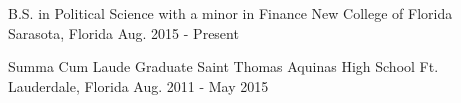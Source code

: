

\begin{cventries}

  \cventry
    {B.S. in Political Science with a minor in Finance} %
    {New College of Florida} %
    {Sarasota, Florida} %
    {Aug. 2015 - Present} %
    {}

  \cventry
    {Summa Cum Laude Graduate} %
    {Saint Thomas Aquinas High School} %
    {Ft. Lauderdale, Florida} %
    {Aug. 2011 - May 2015} %
    {}


\vspace{-.1cm}


\end{cventries}
